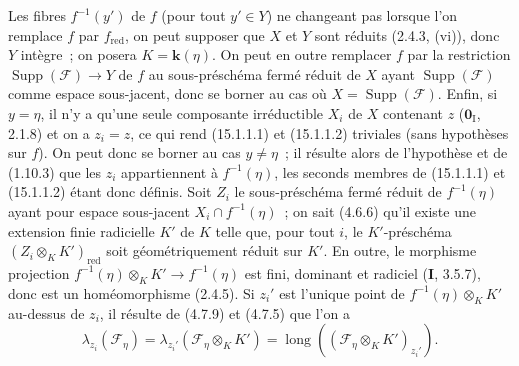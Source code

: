 Les fibres $f^{-1}(y')$ de $f$ (pour tout $y'\in Y$) ne changeant pas lorsque
l'on remplace $f$ par $f_{\mathrm{red}}$, on peut supposer que $X$ et $Y$ sont
réduits (2.4.3, (vi)), donc $Y$ intègre~; on posera
$K=\mathbf{k}(\eta)$. On peut en outre remplacer $f$ par la restriction
$\operatorname{Supp}(\mathcal F)\to Y$ de $f$ au sous-préschéma fermé réduit de
$X$ ayant $\operatorname{Supp}(\mathcal F)$ comme espace sous-jacent, donc se
borner au cas où $X=\operatorname{Supp}(\mathcal F)$. Enfin, si $y=\eta$, il n'y
a qu'une seule composante irréductible $X_i$ de $X$ contenant $z$
($\mathbf{0}_{\mathrm I}$, 2.1.8) et on a $z_i=z$, ce qui rend (15.1.1.1) et
(15.1.1.2) triviales (sans hypothèses sur $f$). On peut donc se borner au cas
$y\ne\eta$~; il résulte alors de l'hypothèse et de (1.10.3) que les $z_i$
appartiennent à $f^{-1}(\eta)$, les seconds membres de (15.1.1.1) et
(15.1.1.2) étant donc définis. Soit $Z_i$ le sous-préschéma fermé réduit de
$f^{-1}(\eta)$ ayant pour espace sous-jacent $X_i\cap f^{-1}(\eta)$~; on sait
(4.6.6) qu'il existe une extension finie radicielle $K'$ de $K$ telle que, pour
tout $i$, le $K'$-préschéma $(Z_i\otimes_K K')_{\mathrm{red}}$ soit
géométriquement réduit sur $K'$. En outre, le morphisme projection
$f^{-1}(\eta)\otimes_K K'\to f^{-1}(\eta)$ est fini, dominant et radiciel
(\textbf{I}, 3.5.7), donc est un homéomorphisme (2.4.5). Si $z_i'$ est l'unique
point de $f^{-1}(\eta)\otimes_K K'$ au-dessus de $z_i$, il résulte de (4.7.9) et
(4.7.5) que l'on a
\[
\tag{15.1.1.3}
\label{IV.15.1.1.3-fr}
  \lambda_{z_i}(\mathcal F_\eta)
  =\lambda_{z_i'}(\mathcal F_\eta\otimes_K K')
  =\operatorname{long}((\mathcal F_\eta\otimes_K K')_{z_i'}).
\]

